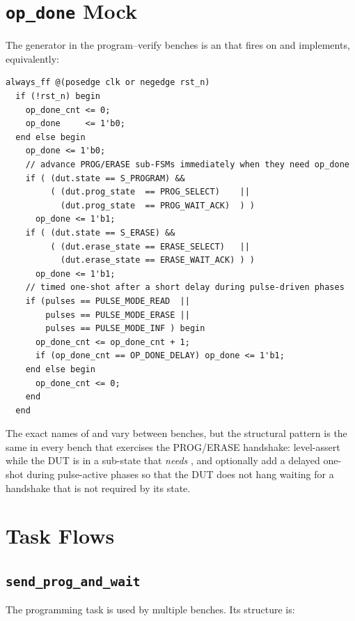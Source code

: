 \section{\texttt{op\_done} Mock}
\label{app:tb-opdone}

The  generator in the program--verify benches is an
 that fires on  and implements,
equivalently:

\begin{lstlisting}[style=svstyle]
always_ff @(posedge clk or negedge rst_n)
  if (!rst_n) begin
    op_done_cnt <= 0;
    op_done     <= 1'b0;
  end else begin
    op_done <= 1'b0;
    // advance PROG/ERASE sub-FSMs immediately when they need op_done
    if ( (dut.state == S_PROGRAM) &&
         ( (dut.prog_state  == PROG_SELECT)    ||
           (dut.prog_state  == PROG_WAIT_ACK)  ) )
      op_done <= 1'b1;
    if ( (dut.state == S_ERASE) &&
         ( (dut.erase_state == ERASE_SELECT)   ||
           (dut.erase_state == ERASE_WAIT_ACK) ) )
      op_done <= 1'b1;
    // timed one-shot after a short delay during pulse-driven phases
    if (pulses == PULSE_MODE_READ  ||
        pulses == PULSE_MODE_ERASE ||
        pulses == PULSE_MODE_INF ) begin
      op_done_cnt <= op_done_cnt + 1;
      if (op_done_cnt == OP_DONE_DELAY) op_done <= 1'b1;
    end else begin
      op_done_cnt <= 0;
    end
  end
\end{lstlisting}

The exact names of  and 
vary between benches, but the structural pattern is the same in every
bench that exercises the PROG/ERASE handshake: level-assert while the
DUT is in a sub-state that \emph{needs} , and
optionally add a delayed one-shot during pulse-active phases so that
the DUT does not hang waiting for a handshake that is not required by
its state.

\section{Task Flows}
\label{app:tb-tasks}

\subsection{\texttt{send\_prog\_and\_wait}}
\label{app:tb-sendprog}

The programming task is used by multiple benches. Its structure is:

